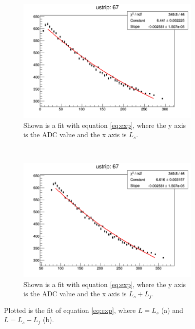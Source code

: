\begin{figure}[h]
    \centering
    \begin{subfigure}[h]{0.4\textwidth}
        \includegraphics[width= \textwidth, keepaspectratio = true]{exponetial67}
        \caption{Shown is a fit with equation \ref{eq:exp}, where the y axis is the ADC value and the x axis is $L_{s}$.}
        \label{fig:exponential67}
    \end{subfigure}
    ~
    \begin{subfigure}[h]{0.4\textwidth}
        \includegraphics[width= \textwidth, keepaspectratio = true]{exponetialwfib67}
        \caption{Shown is a fit with equation \ref{eq:exp}, where the y axis is the ADC value and the x axis is $L_{s} + L_{f}$.}
        \label{fig:exponentialwfib67}
    \end{subfigure}
    \caption{Plotted is the fit of equation \ref{eq:exp}, where $L = L_{s}$ (a) and $L = L_{s} + L_{f}$ (b).}
    \label{fig:expfit}
\end{figure}

